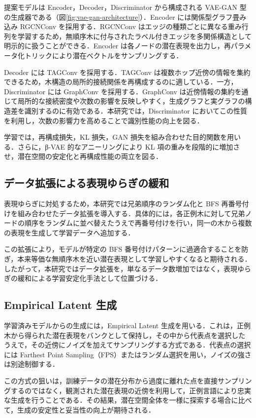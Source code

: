 \documentclass[submit,techrep,noauthor]{ipsj}
\begin{document}
提案モデルは Encoder，Decoder，Discriminator から構成される VAE-GAN 型の生成器である（図\ref{fig:vae-gan-architecture}）．Encoder には関係型グラフ畳み込み RGCNConv を採用する．RGCNConv はエッジの種類ごとに異なる重み行列を学習するため，無順序木に付与されたラベル付きエッジを多関係構造として明示的に扱うことができる．Encoder は各ノードの潜在表現を出力し，再パラメータ化トリックにより潜在ベクトルをサンプリングする．

Decoder には TAGConv を採用する．TAGConv は複数ホップ近傍の情報を集約できるため，木構造の局所的接続関係を再構成するのに適している．一方，Discriminator には GraphConv を採用する．GraphConv は近傍情報の集約を通じて局所的な接続密度や次数の影響を反映しやすく，生成グラフと実グラフの構造差を識別するのに有効である．本研究では，Discriminator においてこの性質を利用し，次数の影響力を高めることで識別性能の向上を図る．

学習では，再構成損失，KL 損失，GAN 損失を組み合わせた目的関数を用いる．さらに，β-VAE 的なアニーリングにより KL 項の重みを段階的に増加させ，潜在空間の安定化と再構成性能の両立を図る．

\subsection{データ拡張による表現ゆらぎの緩和}

表現ゆらぎに対処するため，本研究では兄弟順序のランダム化と BFS 再番号付けを組み合わせたデータ拡張を導入する．具体的には，各正例木に対して兄弟ノードの順序をランダムに並べ替えたうえで再番号付けを行い，同一の木から複数の表現を生成して学習データへ追加する．

この拡張により，モデルが特定の BFS 番号付けパターンに過適合することを防ぎ，本来等価な無順序木を近い潜在表現として学習しやすくなると期待される．したがって，本研究ではデータ拡張を，単なるデータ数増加ではなく，表現ゆらぎの緩和による学習安定化手法として位置づける．

\subsection{Empirical Latent 生成}

学習済みモデルからの生成には，Empirical Latent 生成を用いる．これは，正例木から得られた潜在表現をバンクとして保持し，その中から代表点を選択したうえで，その近傍にノイズを加えてサンプリングする方式である．代表点の選択には Farthest Point Sampling（FPS）またはランダム選択を用い，ノイズの強さは別途制御する．

この方式の狙いは，訓練データの潜在分布から過度に離れた点を直接サンプリングするのではなく，観測された潜在表現の近傍を利用して，正例言語により忠実な生成を行うことである．その結果，潜在空間全体を一様に探索する場合に比べて，生成の安定性と妥当性の向上が期待される．
\end{document}

